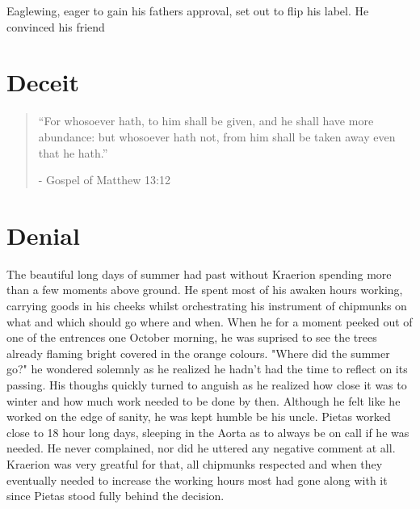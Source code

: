 \documentclass[smalldemyvopaper,11pt,twoside,onecolumn,openright,extrafontsizes]{memoir}
\begin{document}
Eaglewing, eager to gain his fathers approval, set out to flip his label. He convinced his friend




\chapter{Deceit}


\vspace{-1.3cm}
\begin{localsize}{10}
	\begin{quote}
		“For whosoever hath, to him shall be given, and he shall have more abundance: but whosoever hath not, from him shall be taken away even that he hath.”
		\begin{flushright}- Gospel of Matthew 13:12 \end{flushright}
	\end{quote} 
\end{localsize}
\vspace{1cm}


\chapter{Denial}


The beautiful long days of summer had past without Kraerion spending more than a few moments above ground. He spent most of his awaken hours working, carrying goods in his cheeks whilst orchestrating his instrument of chipmunks on what and which should go where and when. When he for a moment peeked out of one of the entrences one October morning, he was suprised to see the trees already flaming bright covered in the orange colours. "Where did the summer go?" he wondered solemnly as he realized he hadn't had the time to reflect on its passing. His thoughs quickly turned to anguish as he realized how close it was to winter and how much work needed to be done by then. Although he felt like he worked on the edge of sanity, he was kept humble be his uncle. Pietas worked close to 18 hour long days, sleeping in the Aorta as to always be on call if he was needed. He never complained, nor did he uttered any negative comment at all. Kraerion was very greatful for that, all chipmunks respected and when they eventually needed to increase the working hours most had gone along with it since Pietas stood fully behind the decision.
\end{document}
